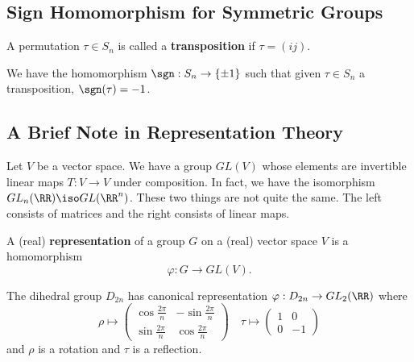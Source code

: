 \subsection{Sign Homomorphism for Symmetric Groups}

\begin{df}
A permutation $\tau \in S_n$ is called a \textbf{transposition} if
$\tau = (ij)$.
\end{df}

\begin{thm}
We have the homomorphism $\sgn : S_n \to \lbrace \pm 1 \rbrace$ such
that given $\tau \in S_n$ a transposition, $\sgn(\tau) = -1$.
\end{thm}

\subsection{A Brief Note in Representation Theory}
Let $V$ be a vector space. We have a group $GL(V)$ whose elements are
invertible linear maps $T : V \to V$ under composition. In fact, we have
the isomorphism $GL_n(\RR) \iso GL(\RR^n)$. These two things are not
quite the same. The left consists of matrices and the right consists of
linear maps.

\begin{df}
A (real) \textbf{representation} of a group $G$ on a (real) vector space
$V$ is a homomorphism
\[ \varphi : G \to GL(V). \]
\end{df}

\begin{ex}
The dihedral group $D_{2n}$ has canonical representation $\varphi :
D_{2n} \to GL_2(\RR)$ where
\[ \rho \mapsto \begin{pmatrix} \cos \frac{2\pi}{n} & -\sin
\frac{2\pi}{n} \\ \sin \frac{2\pi}{n} & \cos \frac{2\pi}{n}
\end{pmatrix} \quad \tau \mapsto \begin{pmatrix} 1 & 0 \\ 0 & -1
\end{pmatrix} \]
and $\rho$ is a rotation and $\tau$ is a reflection.
\end{ex}


